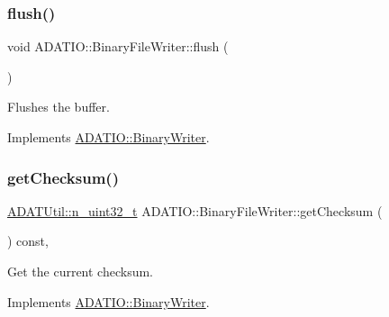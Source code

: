 \subsubsection{\texorpdfstring{flush()}{flush()}\hspace{0.1cm}{\footnotesize\ttfamily [2/2]}}
{\footnotesize\ttfamily void A\+D\+A\+T\+I\+O\+::\+Binary\+File\+Writer\+::flush (\begin{DoxyParamCaption}{ }\end{DoxyParamCaption})\hspace{0.3cm}{\ttfamily [virtual]}}



Flushes the buffer. 



Implements \mbox{\hyperlink{classADATIO_1_1BinaryWriter_a1d335eeed64094b8641f3ebf731c981e}{A\+D\+A\+T\+I\+O\+::\+Binary\+Writer}}.

\mbox{\label{classADATIO_1_1BinaryFileWriter_ad6f9d995a02d4b3e8e12ad18972d58a5}} 
\subsubsection{\texorpdfstring{getChecksum()}{getChecksum()}\hspace{0.1cm}{\footnotesize\ttfamily [1/2]}}
{\footnotesize\ttfamily \mbox{\hyperlink{namespaceADATUtil_ad945a8afa4db2d1f89b731964adae97e}{A\+D\+A\+T\+Util\+::n\+\_\+uint32\+\_\+t}} A\+D\+A\+T\+I\+O\+::\+Binary\+File\+Writer\+::get\+Checksum (\begin{DoxyParamCaption}{ }\end{DoxyParamCaption}) const\hspace{0.3cm}{\ttfamily [inline]}, {\ttfamily [virtual]}}



Get the current checksum. 



Implements \mbox{\hyperlink{classADATIO_1_1BinaryWriter_a8bebb70a7248b14c8a4dcf7aa49c1503}{A\+D\+A\+T\+I\+O\+::\+Binary\+Writer}}.

\mbox{\label{classADATIO_1_1BinaryFileWriter_ad6f9d995a02d4b3e8e12ad18972d58a5}} 
